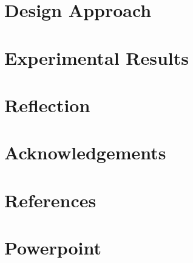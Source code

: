 \documentclass[11pt, oneside]{article}   	%
\begin{document}
\section{Design Approach}
\section{Experimental Results}
\section{Reflection}
\section{Acknowledgements}
\section*{References}
\section*{Powerpoint}
\end{document}

